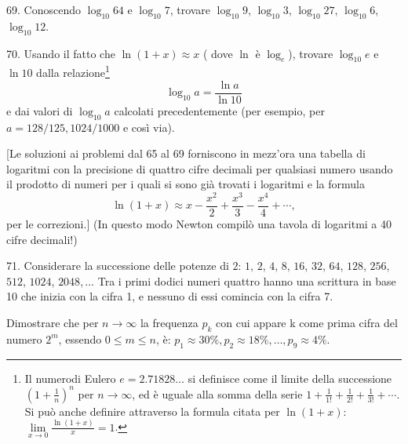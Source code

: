 \begin{problem}{69.}
	Conoscendo $\log_{10} 64$ e $\log_{10} 7$, trovare $\log_{10} 9$, $\log_{10} 3$,
    $\log_{10} 27$, $\log_{10} 6$, $\log_{10} 12$.
\end{problem}

\begin{problem}{70.}
	Usando il fatto che $\ln (1+x) \approx x$ ( dove $\ln$ è $\log_e$), trovare $\log_{10} e$ e
    $\ln 10$ dalla relazione\footnote{Il numerodi Eulero $e = 2{.}71828\dots$ si definisce come il limite della successione
	$\left(1+\frac{1}{n}\right)^n$ per $n\to \infty$, ed è uguale alla somma della serie
	$1+\frac{1}{1!} +\frac{1}{2!}+\frac{1}{3!}+\dotsb$. Si può anche definire attraverso la  formula citata per $\ln (1+x)$: $\lim\limits_{x\to 0}\frac{\ln(1+x)}{x} = 1$.}
	\begin{equation*}
		\log_{10} a=\frac{\ln a}{\ln 10}
	\end{equation*}
	e dai valori di $\log_{10} a$ calcolati precedentemente (per esempio, per $a=128/125, 1024/1000$
	e così via).

	[Le soluzioni ai problemi dal  65 al 69 forniscono in mezz’ora una tabella di logaritmi con la precisione di quattro cifre decimali per qualsiasi numero usando il prodotto di numeri per i quali si sono già trovati i logaritmi e la formula
	\begin{equation*}
		\ln (1+x) \approx x-\frac{x^2}{2}+\frac{x^3}{3}-\frac{x^4}{4}+\dotsb,
	\end{equation*}
	per le correzioni.] (In  questo modo Newton compilò una tavola di logaritmi a 40 cifre decimali!)
\end{problem}

\begin{problem}{71.}
	Considerare la  successione delle potenze di $2$: $1$, $2$, $4$, $8$, $16$, $32$, $64$,
	$128$, $256$, $512$, $1024$, $2048, \dotsc$ Tra i primi dodici numeri quattro hanno una scrittura in base 10 che inizia con la cifra 1, e nessuno di essi comincia con la cifra 7.

	Dimostrare che per $n \to \infty$ la frequenza $p_{k}$ con cui appare k come prima cifra del numero $2^m$, essendo
	$0\leqslant m \leqslant n$, è:
	$p_1 \approx 30\%, p_2 \approx 18\%, \dotsc, p_9 \approx 4\%$.
\end{problem}

